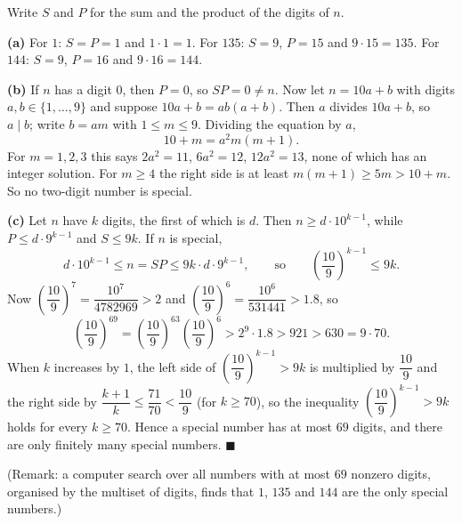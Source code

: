 Write $S$ and $P$ for the sum and the product of the digits of $n$.

\textbf{(a)} For $1$: $S=P=1$ and $1\cdot1=1$. For $135$: $S=9$, $P=15$ and $9\cdot15=135$. For $144$: $S=9$, $P=16$ and $9\cdot16=144$.

\textbf{(b)} If $n$ has a digit $0$, then $P=0$, so $SP=0\ne n$. Now let $n=10a+b$ with digits $a,b\in\{1,\dots,9\}$ and suppose $10a+b=ab(a+b)$. Then $a$ divides $10a+b$, so $a\mid b$; write $b=am$ with $1\le m\le9$. Dividing the equation by $a$,
\[10+m=a^2m(m+1).\]
For $m=1,2,3$ this says $2a^2=11$, $6a^2=12$, $12a^2=13$, none of which has an integer solution. For $m\ge4$ the right side is at least $m(m+1)\ge5m>10+m$. So no two-digit number is special.

\textbf{(c)} Let $n$ have $k$ digits, the first of which is $d$. Then $n\ge d\cdot10^{k-1}$, while $P\le d\cdot9^{k-1}$ and $S\le9k$. If $n$ is special,
\[d\cdot10^{k-1}\le n=SP\le9k\cdot d\cdot9^{k-1},\qquad\text{so}\qquad\left(\dfrac{10}{9}\right)^{k-1}\le9k.\]
Now $\left(\dfrac{10}{9}\right)^7=\dfrac{10^7}{4782969}>2$ and $\left(\dfrac{10}{9}\right)^6=\dfrac{10^6}{531441}>1.8$, so
\[\left(\dfrac{10}{9}\right)^{69}=\left(\dfrac{10}{9}\right)^{63}\left(\dfrac{10}{9}\right)^{6}>2^9\cdot1.8>921>630=9\cdot70.\]
When $k$ increases by $1$, the left side of $\left(\dfrac{10}{9}\right)^{k-1}>9k$ is multiplied by $\dfrac{10}{9}$ and the right side by $\dfrac{k+1}{k}\le\dfrac{71}{70}<\dfrac{10}{9}$ (for $k\ge70$), so the inequality $\left(\dfrac{10}{9}\right)^{k-1}>9k$ holds for every $k\ge70$. Hence a special number has at most $69$ digits, and there are only finitely many special numbers. $\blacksquare$

(Remark: a computer search over all numbers with at most $69$ nonzero digits, organised by the multiset of digits, finds that $1$, $135$ and $144$ are the only special numbers.)
